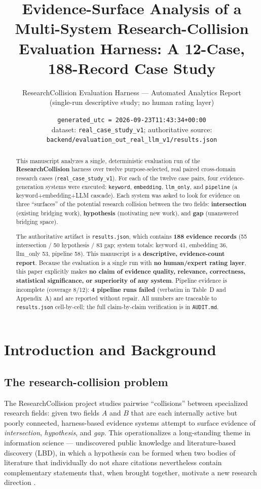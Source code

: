 \documentclass[11pt]{article}
\title{\textbf{Evidence-Surface Analysis of a Multi-System Research-Collision\\ Evaluation Harness: A 12-Case, 188-Record Case Study}}
\author{ResearchCollision Evaluation Harness --- Automated Analytics Report\\\small (single-run descriptive study; no human rating layer)}
\date{\texttt{generated\_utc = 2026-09-23T11:43:34+00:00}\\\small dataset: \texttt{real\_case\_study\_v1}; authoritative source: \texttt{backend/evaluation\_out\_real\_llm\_v1/results.json}}
\begin{document}
\maketitle

\begin{abstract}
\noindent
This manuscript analyzes a single, deterministic evaluation run of the
\textbf{ResearchCollision} harness over twelve purpose-selected, real paired
cross-domain research cases (\texttt{real\_case\_study\_v1}). For each of the
twelve case pairs, four evidence-generation systems were executed:
\texttt{keyword}, \texttt{embedding}, \texttt{llm\_only}, and \texttt{pipeline}
(a keyword+embedding+LLM cascade). Each system was asked to look for evidence on
three ``surfaces'' of the potential research collision between the two fields:
\textbf{intersection} (existing bridging work), \textbf{hypothesis} (motivating
new work), and \textbf{gap} (unanswered bridging space).

The authoritative artifact is \texttt{results.json}, which contains \textbf{188
evidence records} (55 intersection / 50 hypothesis / 83 gap; system totals:
keyword 41, embedding 36, llm\_only 53, pipeline 58). This manuscript is a
\textbf{descriptive, evidence-count report}. Because the evaluation is a single
run with \textbf{no human/expert rating layer}, this paper explicitly makes
\textbf{no claim of evidence quality, relevance, correctness, statistical
significance, or superiority of any system}. Pipeline evidence is incomplete
(coverage 8/12): \textbf{4 pipeline runs failed} (verbatim in Table~D and
Appendix~A) and are reported without repair. All numbers are traceable to
\texttt{results.json} cell-by-cell; the full claim-by-claim verification is in
\texttt{AUDIT.md}.
\end{abstract}

\section{Introduction and Background}
\label{sec:intro}

\subsection{The research-collision problem}
The ResearchCollision project studies pairwise ``collisions'' between
specialized research fields: given two fields $A$ and $B$ that are each
internally active but poorly connected, harness-based evidence systems attempt to
surface evidence of \textit{intersection}, \textit{hypothesis}, and \textit{gap}.
This operationalizes a long-standing theme in information science ---
undiscovered public knowledge and literature-based discovery (LBD), in which a
hypothesis can be formed when two bodies of literature that individually do not
share citations nevertheless contain complementary statements that, when brought
together, motivate a new research direction \citep{swanson1986, swanson1997}.
\end{document}
